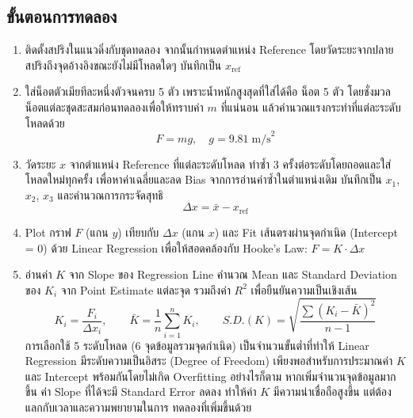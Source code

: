 \subsection{ขั้นตอนการทดลอง}

\begin{enumerate}
    \item ติดตั้งสปริงในแนวดิ่งกับชุดทดลอง จากนั้นกำหนดตำแหน่ง Reference โดยวัดระยะจากปลายสปริงถึงจุดอ้างอิงขณะยังไม่มีโหลดใดๆ บันทึกเป็น $x_\text{ref}$
    \item ใส่น็อตตัวเมียทีละหนึ่งตัวจนครบ 5 ตัว เพราะน้ำหนักสูงสุดที่ใส่ได้คือ น็อต 5 ตัว โดยชั่งมวลน็อตแต่ละชุดสะสมก่อนทดลองเพื่อให้ทราบค่า $m$ ที่แน่นอน แล้วคำนวณแรงกระทำที่แต่ละระดับโหลดด้วย
    \begin{equation}
        F = mg, \quad g = 9.81 \; \text{m/s}^2
        \label{eq:weight}
    \end{equation}
    \item วัดระยะ $x$ จากตำแหน่ง Reference ที่แต่ละระดับโหลด ทำซ้ำ 3 ครั้งต่อระดับโดยถอดและใส่โหลดใหม่ทุกครั้ง เพื่อหาค่าเฉลี่ยและลด Bias จากการอ่านค่าซ้ำในตำแหน่งเดิม บันทึกเป็น $x_1$, $x_2$, $x_3$ และคำนวณการกระจัดสุทธิ
    \begin{equation}
        \Delta x = \bar{x} - x_\text{ref}
        \label{eq:displacement}
    \end{equation}
    \item Plot กราฟ $F$ (แกน $y$) เทียบกับ $\Delta x$ (แกน $x$) และ Fit เส้นตรงผ่านจุดกำเนิด (Intercept = 0) ด้วย Linear Regression เพื่อให้สอดคล้องกับ Hooke's Law: $F = K \cdot \Delta x$
    \item อ่านค่า $K$ จาก Slope ของ Regression Line คำนวณ Mean และ Standard Deviation ของ $K_i$ จาก Point Estimate แต่ละจุด รวมถึงค่า $R^2$ เพื่อยืนยันความเป็นเชิงเส้น
    \begin{equation}
        K_i = \frac{F_i}{\Delta x_i}, \qquad
        \bar{K} = \frac{1}{n}\sum_{i=1}^{n} K_i, \qquad
        S.D.(K) = \sqrt{\frac{\sum(K_i - \bar{K})^2}{n-1}}
        \label{eq:k_stats}
    \end{equation}
    การเลือกใช้ 5 ระดับโหลด (6 จุดข้อมูลรวมจุดกำเนิด) เป็นจำนวนขั้นต่ำที่ทำให้ Linear Regression
มีระดับความเป็นอิสระ (Degree of Freedom) เพียงพอสำหรับการประมาณค่า $K$ และ Intercept 
พร้อมกันโดยไม่เกิด Overfitting อย่างไรก็ตาม หากเพิ่มจำนวนจุดข้อมูลมากขึ้น ค่า Slope ที่ได้จะมี 
Standard Error ลดลง ทำให้ค่า $K$ มีความน่าเชื่อถือสูงขึ้น แต่ต้องแลกกับเวลาและความพยายามในการ
ทดลองที่เพิ่มขึ้นด้วย
\end{enumerate}

